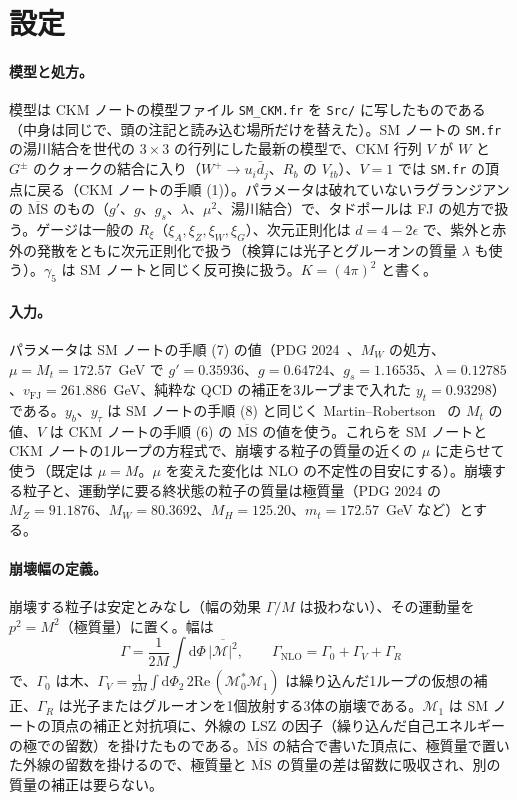 \documentclass[a4paper,10pt]{ltjsarticle}
\newcommand{\dd}{\mathrm{d}}
\newcommand{\MSbar}{\overline{\mathrm{MS}}}
\newcommand{\re}{\mathrm{Re}\,}
\begin{document}
\section{設定}\label{sec:setup}

\paragraph{模型と処方。}模型は CKM ノートの模型ファイル \texttt{SM\_CKM.fr} を \texttt{Src/} に写したものである（中身は同じで、頭の注記と読み込む場所だけを替えた）。SM ノートの \texttt{SM.fr} の湯川結合を世代の $3\times3$ の行列にした最新の模型で、CKM 行列 $V$ が $W$ と $G^\pm$ のクォークの結合に入り（$W^+\to u_i\bar d_j$、$R_b$ の $V_{tb}$）、$V=1$ では \texttt{SM.fr} の頂点に戻る（CKM ノートの手順 (1)）。パラメータは破れていないラグランジアンの $\MSbar$ のもの（$g'$、$g$、$g_s$、$\lambda$、$\mu^2$、湯川結合）で、タドポールは FJ の処方で扱う。ゲージは一般の $R_\xi$（$\xi_A,\xi_Z,\xi_W,\xi_G$）、次元正則化は $d=4-2\epsilon$ で、紫外と赤外の発散をともに次元正則化で扱う（検算には光子とグルーオンの質量 $\lambda$ も使う）。$\gamma_5$ は SM ノートと同じく反可換に扱う。$K=(4\pi)^2$ と書く。

\paragraph{入力。}パラメータは SM ノートの手順 (7) の値（PDG 2024~\cite{pdg24}、$M_W$ の処方、$\mu=M_t=172.57$~GeV で $g'=0.35936$、$g=0.64724$、$g_s=1.16535$、$\lambda=0.12785$、$v_{\mathrm{FJ}}=261.886$~GeV、純粋な QCD の補正を3ループまで入れた $y_t=0.93298$）である。$y_b$、$y_\tau$ は SM ノートの手順 (8) と同じく Martin--Robertson~\cite{mr19} の $M_t$ の値、$V$ は CKM ノートの手順 (6) の $\MSbar$ の値を使う。これらを SM ノートと CKM ノートの1ループの方程式で、崩壊する粒子の質量の近くの $\mu$ に走らせて使う（既定は $\mu=M$。$\mu$ を変えた変化は NLO の不定性の目安にする）。崩壊する粒子と、運動学に要る終状態の粒子の質量は極質量（PDG 2024 の $M_Z=91.1876$、$M_W=80.3692$、$M_H=125.20$、$m_t=172.57$~GeV など）とする。

\paragraph{崩壊幅の定義。}崩壊する粒子は安定とみなし（幅の効果 $\Gamma/M$ は扱わない）、その運動量を $p^2=M^2$（極質量）に置く。幅は
\begin{equation}
\Gamma=\frac1{2M}\int\dd\Phi\,\overline{|\mathcal M|^2},\qquad \Gamma_{\mathrm{NLO}}=\Gamma_0+\Gamma_V+\Gamma_R
\label{eq:gammadef}
\end{equation}
で、$\Gamma_0$ は木、$\Gamma_V=\frac1{2M}\int\dd\Phi_2\,2\re(\mathcal M_0^*\mathcal M_1)$ は繰り込んだ1ループの仮想の補正、$\Gamma_R$ は光子またはグルーオンを1個放射する3体の崩壊である。$\mathcal M_1$ は SM ノートの頂点の補正と対抗項に、外線の LSZ の因子（繰り込んだ自己エネルギーの極での留数）を掛けたものである。$\MSbar$ の結合で書いた頂点に、極質量で置いた外線の留数を掛けるので、極質量と $\MSbar$ の質量の差は留数に吸収され、別の質量の補正は要らない。
\end{document}
